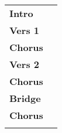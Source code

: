 
\begin{tabular}{p{1.6cm}l}
	\textbf{Intro}  &  \\
	\textbf{Vers 1} &  \\
	\textbf{Chorus} &  \\
	\textbf{Vers 2} &  \\
	\textbf{Chorus} &  \\
	\textbf{Bridge} &  \\
	\textbf{Chorus} &  \\
	& \\
\end{tabular}